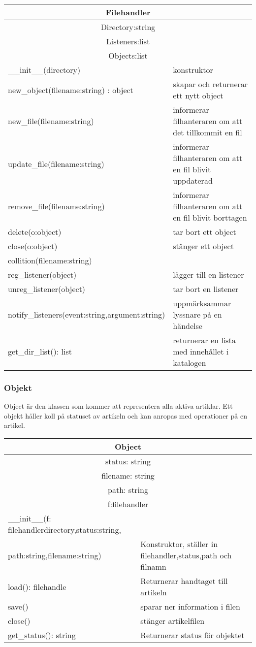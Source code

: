 \begin{tabular}{|l|l|}
\hline
\multicolumn{2}{|c|}{\textbf{Filehandler}} \\
\hline
\multicolumn{2}{|c|}{Directory:string} \\
\multicolumn{2}{|c|}{Listeners:list} \\
\multicolumn{2}{|c|}{Objects:list} \\
\hline
\_\_init\_\_(directory) &konstruktor\\
new\_object(filename:string) : object & skapar och returnerar ett nytt object\\
new\_file(filename:string) & informerar filhanteraren om att det tillkommit en fil\\
update\_file(filename:string) & informerar filhanteraren om att en fil blivit uppdaterad\\
remove\_file(filename:string) & informerar filhanteraren om att en fil blivit borttagen\\
delete(o:object) & tar bort ett object\\
close(o:object) & stänger ett object\\
collition(filename:string) &\\
reg\_listener(object) & lägger till en listener \\
unreg\_listener(object) & tar bort en listener \\
notify\_listeners(event:string,argument:string) & uppmärksammar lyssnare på en händelse\\
get\_dir\_list(): list & returnerar en lista med innehållet i katalogen\\
\hline
\end{tabular}

\subsubsection{Objekt}
Object är den klassen som kommer att representera alla aktiva artiklar. Ett objekt håller koll på statuset av artikeln och kan anropas med operationer på en artikel.

\begin{tabular}{|l|l|}
\hline
\multicolumn{2}{|c|}{\textbf{Object}} \\
\hline
\multicolumn{2}{|c|}{status: string} \\
\multicolumn{2}{|c|}{filename: string} \\
\multicolumn{2}{|c|}{path: string} \\
\multicolumn{2}{|c|}{f:filehandler} \\
\hline
\_\_init\_\_(f: filehandlerdirectory,status:string, &\\
path:string,filename:string) &Konstruktor, ställer in filehandler,status,path och filnamn\\
load(): filehandle & Returnerar handtaget till artikeln \\
save() & sparar ner information i filen \\
close() & stänger artikelfilen\\
get\_status(): string & Returnerar status för objektet \\
\hline
\end{tabular}

